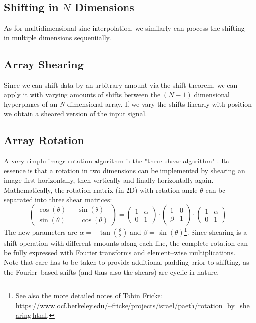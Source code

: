 \documentclass{juliacon}
\def\sinc{\mathrm{sinc}}
\begin{document}
        \subsection{Shifting in $N$ Dimensions}
            As for multidimensional $\sinc$ interpolation, we similarly can process the shifting in multiple dimensions sequentially.
            
    \subsection{Array Shearing}
        Since we can shift data by an arbitrary amount via the shift theorem, 
        we can apply it with varying amounts of shifts between the $(N-1)$ dimensional hyperplanes of an $N$ dimensional array. If we vary the shifts linearly with position we obtain a sheared version of the input signal.
            
    \subsection{Array Rotation}
        A very simple image rotation algorithm is the "three shear algorithm" \cite{Paeth1986:15}.
        Its essence is that a rotation in two dimensions can be implemented by shearing an image first horizontally, then vertically and finally horizontally again.
        Mathematically, the rotation matrix (in 2D) with rotation angle $\theta$ can be separated into three shear matrices:
        \begin{equation}
            \begin{pmatrix}
                \cos(\theta) & -\sin(\theta)\\
                \sin(\theta) & \phantom{-}\cos(\theta)
            \end{pmatrix} 
            =  \begin{pmatrix}
                1 & \alpha\\
                0 & 1
            \end{pmatrix}
            \cdot
             \begin{pmatrix}
                1 & 0\\
                \beta & 1
            \end{pmatrix}
            \cdot
             \begin{pmatrix}
                1 & \alpha\\
                0 & 1
            \end{pmatrix}
        \end{equation}
        The new parameters are $\alpha=-\tan\left(\frac{\theta}{2} \right)$ and $\beta=\sin(\theta)$\footnote{See also the more detailed notes of Tobin Fricke: \url{https://www.ocf.berkeley.edu/~fricke/projects/israel/paeth/rotation_by_shearing.html}.}.
        Since shearing is a shift operation with different amounts along each line, the complete rotation
        can be fully expressed with Fourier transforms and element--wise multiplications. Note that care has to be taken to provide additional padding prior to shifting, as the Fourier--based shifts (and thus also the shears) are cyclic in nature.
\end{document}
